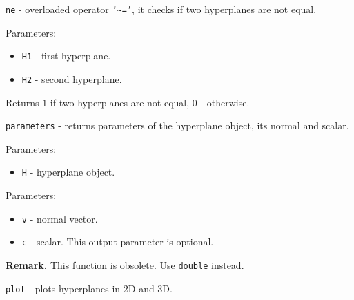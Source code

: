 \documentclass{report}
\begin{document}
\newpage

{\Large {\tt ne}} - overloaded operator {\tt '\~{ }='},
it checks if two hyperplanes are not equal.

Parameters:
\begin{itemize}
\item {\tt H1} - first hyperplane.
\item {\tt H2} - second hyperplane.
\end{itemize}

Returns $1$ if two hyperplanes are not equal, $0$ - otherwise.



\newpage

{\Large {\tt parameters}} - returns parameters of the hyperplane object,
its normal and scalar.

Parameters:
\begin{itemize}
\item {\tt H} - hyperplane object.
\end{itemize}

Parameters:
\begin{itemize}
\item {\tt v} - normal vector.
\item {\tt c} - scalar. This output parameter is optional.
\end{itemize}

{\bf Remark.} This function is obsolete. Use {\tt double} instead.

\newpage

{\Large {\tt plot}} - plots hyperplanes in 2D and 3D.
\end{document}

